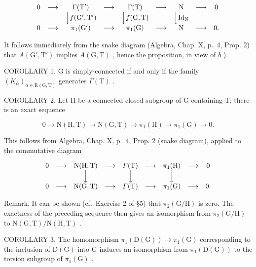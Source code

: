 \[
\begin{array}{c c c c c c c c c} 0 & \longrightarrow & \Gamma (\mathrm{T} ^ {\prime}) & \longrightarrow & \Gamma (\mathrm{T}) & \longrightarrow & \mathrm{N} & \longrightarrow & 0 \\ & & \Big \downarrow f (\mathrm{G} ^ {\prime}, \mathrm{T} ^ {\prime}) & & \Big \downarrow f (\mathrm{G}, \mathrm{T}) & & \Big \downarrow \mathrm{Id} _ {\mathrm{N}} \\ 0 & \longrightarrow & \pi_ {1} (\mathrm{G} ^ {\prime}) & \longrightarrow & \pi_ {1} (\mathrm{G}) & \longrightarrow & \mathrm{N} & \longrightarrow & 0. \end{array}
\]

It follows immediately from the snake diagram (Algebra, Chap. X, p.~4, Prop. 2) that \(A(\mathrm{G}', \mathrm{T}')\) implies \(A(\mathrm{G}, \mathrm{T})\) , hence the proposition, in view of \(b\) ).

COROLLARY 1. G is simply-connected if and only if the family \((K_{\alpha})_{\alpha \in \mathrm{R}(\mathrm{G},\mathrm{T})}\) generates \(\Gamma (\mathrm{T})\) .

COROLLARY 2. Let H be a connected closed subgroup of G containing T; there is an exact sequence

\[
0 \longrightarrow \mathrm{N} (\mathrm{H}, \mathrm{T}) \longrightarrow \mathrm{N} (\mathrm{G}, \mathrm{T}) \longrightarrow \pi_ {1} (\mathrm{H}) \longrightarrow \pi_ {1} (\mathrm{G}) \longrightarrow 0.
\]

This follows from Algebra, Chap. X, p.~4, Prop. 2 (snake diagram), applied to the commutative diagram

\[
\begin{array}{c c c c c c c c c} 0 & \longrightarrow & \mathrm{N(H,T)} & \longrightarrow & \varGamma (\mathrm{T}) & \longrightarrow & \pi_ {1} (\mathrm{H}) & \longrightarrow & 0 \\ & & \Big \downarrow & & \Big \downarrow & & \Big \downarrow & & \\ 0 & \longrightarrow & \mathrm{N(G,T)} & \longrightarrow & \varGamma (\mathrm{T}) & \longrightarrow & \pi_ {1} (\mathrm{G}) & \longrightarrow & 0. \end{array}
\]

Remark. It can be shown (cf.~Exercise 2 of §5) that \(\pi_2(\mathrm{G / H})\) is zero. The exactness of the preceding sequence then gives an isomorphism from \(\pi_2(\mathrm{G / H})\) to \(\mathrm{N(G,T) / N(H,T)}\) .

COROLLARY 3. The homomorphism \(\pi_1(\mathrm{D}(\mathrm{G})) \to \pi_1(\mathrm{G})\) corresponding to the inclusion of \(\mathrm{D}(\mathrm{G})\) into \(\mathrm{G}\) induces an isomorphism from \(\pi_1(\mathrm{D}(\mathrm{G}))\) to the torsion subgroup of \(\pi_1(\mathrm{G})\) .


